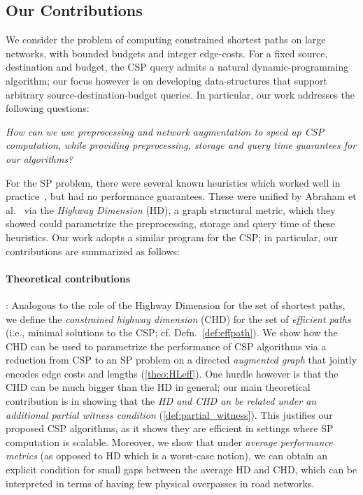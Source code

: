 \subsection{Our Contributions}
We consider the problem of computing constrained shortest paths on large networks, with bounded budgets and integer edge-costs. For a fixed source, destination and budget, the CSP query admits a natural dynamic-programming algorithm; our focus however is on developing data-structures that support arbitrary source-destination-budget queries. In particular, our work addresses the following questions:
\vspace{-0.1cm}
\begin{center}
\emph{How can we use preprocessing and network augmentation to speed up CSP computation, while providing preprocessing, storage and query time guarantees for our algorithms?}
\end{center}
\vspace{-0.1cm}

For the SP problem, there were several known heuristics which worked well in practice~\cite{dimacs09}, but had no performance guarantees.
These were unified by Abraham et al.~\cite{highway2013, highway2010} via the \emph{Highway Dimension} (HD), a graph structural metric, which they showed could parametrize the preprocessing, storage and query time of these heuristics.
Our work adopts a similar program for the CSP; in particular, our contributions are summarized as follows:

\paragraph{Theoretical contributions}: 
Analogous to the role of the Highway Dimension for the set of shortest paths, we define the \emph{constrained highway dimension} (CHD) for the set of {\em efficient paths} (i.e., minimal solutions to the CSP; cf. Defn.~\ref{def:effpath}). We show how the CHD can be used to parametrize the performance of CSP algorithms via a reduction from CSP to an SP problem on a directed \emph{augmented graph} that jointly encodes edge costs and lengths (\cref{theo:HLeff}). One hurdle however is that the CHD can be much bigger than the HD in general; our main theoretical contribution is in showing that the \emph{HD and CHD an be related under an additional partial witness condition} (\cref{def:partial_witness}). 
This justifies our proposed CSP algorithms, as it shows they are efficient in settings where SP computation is scalable. Moreover, we show that under \emph{average performance metrics} (as opposed to HD which is a worst-case notion), we can obtain an explicit condition for small gaps between the average HD and CHD, which can be interpreted in terms of having few physical overpasses in road networks.

